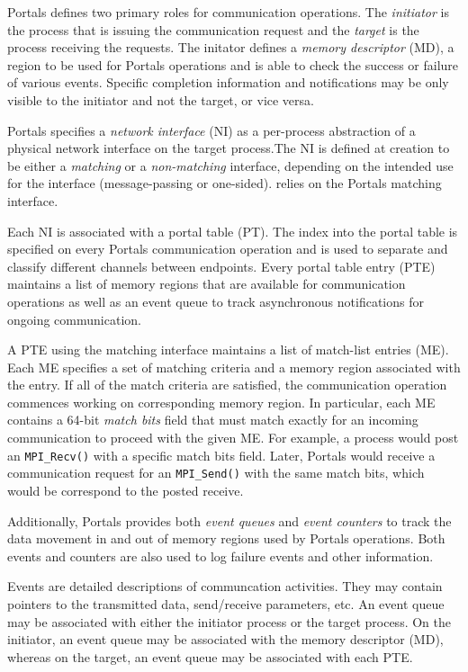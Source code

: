 Portals defines two primary roles for communication operations. The
{\em initiator} is the process that is issuing the communication
request and the {\em target} is the process receiving the
requests. The initator defines a {\em memory descriptor} (MD), a
region to be used for Portals operations and is able to check the
success or failure of various events. Specific completion information
and notifications may be only visible to the initiator and not the
target, or vice versa.

Portals specifies a {\em network interface} (NI) as a per-process
abstraction of a physical network interface on the target process.The
NI is defined at creation to be either a {\em matching} or a {\em
  non-matching} interface, depending on the intended use for the
interface (message-passing or one-sided). \pdht relies on the Portals
matching interface.

Each NI is associated with a portal table (PT). The index into the
portal table is specified on every Portals communication operation and
is used to separate and classify different channels between endpoints.
Every portal table entry (PTE) maintains a list of memory regions that
are available for communication operations as well as an event queue
to track asynchronous notifications for ongoing communication.

A PTE using the matching interface maintains a list of match-list
entries (ME). Each ME specifies a set of matching criteria and a
memory region associated with the entry. If all of the match criteria
are satisfied, the communication operation commences working on
corresponding memory region. In particular, each ME contains a 64-bit
{\em match bits} field that must match exactly for an incoming
communication to proceed with the given ME. For example, a process
would post an {\tt MPI\_Recv()} with a specific match bits
field. Later, Portals would receive a communication request for an
{\tt MPI\_Send()} with the same match bits, which would be correspond
to the posted receive.

Additionally, Portals provides both {\em event queues} and {\em event
  counters} to track the data movement in and out of memory regions
used by Portals operations. Both events and counters are also used to
log failure events and other information. 

Events are detailed descriptions of communcation activities. They may
contain pointers to the transmitted data, send/receive parameters,
etc. An event queue may be associated with either the initiator
process or the target process.  On the initiator, an event queue may
be associated with the memory descriptor (MD), whereas on the target,
an event queue may be associated with each PTE. 

